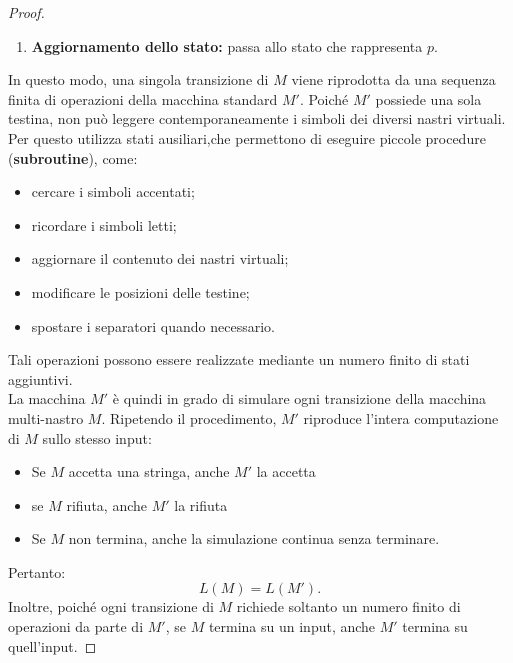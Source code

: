 \begin{proof}
\begin{enumerate}
    \item \textbf{Aggiornamento dello stato:}
    passa allo stato che rappresenta $p$.
\end{enumerate}
In questo modo, una singola transizione di $M$
viene riprodotta da una sequenza finita
di operazioni della macchina standard $M'$. Poiché $M'$ possiede una sola testina,
non può leggere contemporaneamente i simboli dei diversi nastri virtuali.\\
Per questo utilizza stati ausiliari,che permettono di eseguire piccole procedure (\textbf{subroutine}), come:
\begin{itemize}
    \item cercare i simboli accentati;
    \item ricordare i simboli letti;
    \item aggiornare il contenuto dei nastri virtuali;
    \item modificare le posizioni delle testine;
    \item spostare i separatori quando necessario.
\end{itemize}
Tali operazioni possono essere realizzate
mediante un numero finito di stati aggiuntivi.\\
La macchina $M'$ è quindi in grado di simulare ogni transizione della macchina multi-nastro $M$.
Ripetendo il procedimento, $M'$ riproduce l'intera computazione di $M$ sullo stesso input:
\begin{itemize}[label=--]
    \item Se $M$ accetta una stringa, anche $M'$ la accetta
    \item se $M$ rifiuta, anche $M'$ la rifiuta
    \item Se $M$ non termina, anche la simulazione continua
senza terminare.
\end{itemize}
Pertanto:
\[
    \boxed{L(M)=L(M')}.
\]
Inoltre, poiché ogni transizione di $M$
richiede soltanto un numero finito di operazioni
da parte di $M'$, se $M$ termina su un input,
anche $M'$ termina su quell'input.
\end{proof}

\newpage


